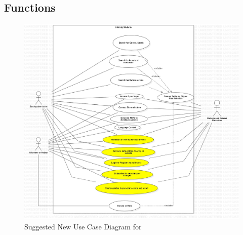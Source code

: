\subsection{Functions}

\vfill
\begin{figure}[H]
  \centering
  \includegraphics[width=\linewidth]{img/use-case-diagram-s4.jpg}
  \caption{Suggested New Use Case Diagram for \afetbilgi}
\end{figure}
\vfill
\newpage


